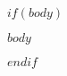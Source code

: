 $if(body)$
\setsecheadstyle{\noindent\scshape\large\centering}
\thispagestyle{empty}
\begin{vplace}[0.3]
\begin{center}
$body$
\end{center}
\end{vplace}
\cleardoublepage
\setsecheadstyle{\noindent\scshape\textnormal\raggedright}
$endif$
